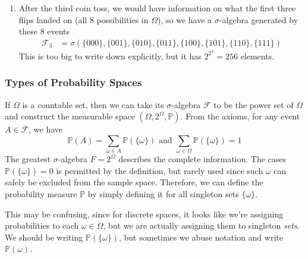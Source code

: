 \documentclass{article}
\begin{document}
\begin{example}
\begin{enumerate}
          \item After the third coin toss, we would have information on what the first three flips landed on (all 8 possibilities in $\Omega$), so we have a $\sigma$-algebra generated by these 8 events 
          \begin{align}
            \mathcal{F}_3 & = \sigma(\{000\}, \{001\}, \{010\}, \{011\}, \{100\}, \{101\}, \{110\}, \{111\})
          \end{align}
          This is too big to write down explicitly, but it has $2^{2^3} = 256$ elements. 
        \end{enumerate}
      \end{example}

    \subsubsection{Types of Probability Spaces}

      \begin{definition}
        If $\Omega$ is a countable set, then we can take its $\sigma$-algebra $\mathcal{F}$ to be the power set of $\Omega$ and construct the measurable space $(\Omega, 2^\Omega, \mathbb{P})$. From the axioms, for any event $A \in \mathcal{F}$, we have
        \begin{equation}
          \mathbb{P} (A) = \sum_{\omega \in A} \mathbb{P}(\{\omega\}) \text{ and } \sum_{\omega \in \Omega} \mathbb{P}(\{\omega\}) = 1
        \end{equation}
        The greatest $\sigma$-algebra $F = 2^{\Omega}$ describes the complete information. The cases $\mathbb{P}(\{\omega\}) = 0$ is permitted by the definition, but rarely used since such $\omega$ can safely be excluded from the sample space. Therefore, we can define the probability measure $\mathbb{P}$ by simply defining it for all singleton sets $\{\omega\}$. 
      \end{definition}

      This may be confusing, since for discrete spaces, it looks like we're assigning probabilities to each $\omega \in \Omega$, but we are actually assigning them to singleton \textit{sets}. We should be writing $\mathbb{P}(\{\omega\})$, but sometimes we abuse notation and write $\mathbb{P}(\omega)$. 
\end{document}
